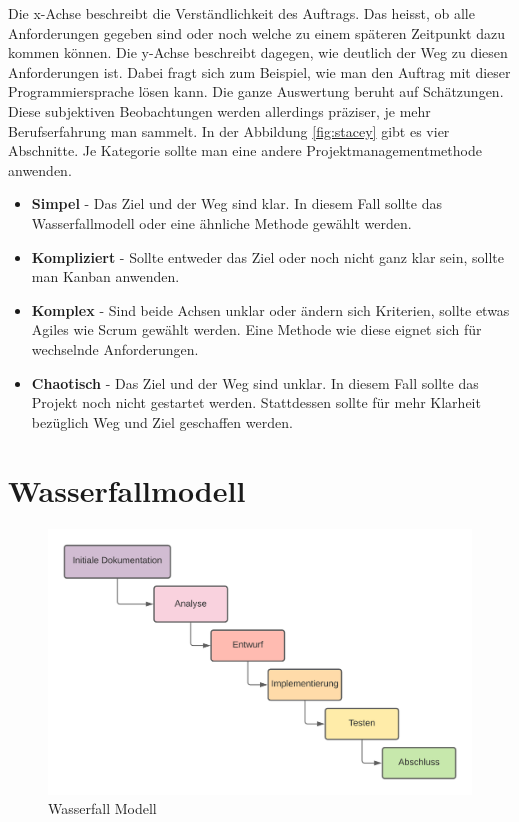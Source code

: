 Die x-Achse beschreibt die Verständlichkeit des Auftrags. Das heisst, ob alle Anforderungen gegeben sind oder noch welche zu einem späteren Zeitpunkt dazu kommen können. Die y-Achse beschreibt dagegen, wie deutlich der Weg zu diesen Anforderungen ist. Dabei fragt sich zum Beispiel, wie man den Auftrag mit dieser Programmiersprache lösen kann.
\newline
Die ganze Auswertung beruht auf Schätzungen. Diese subjektiven Beobachtungen werden allerdings präziser, je mehr Berufserfahrung man sammelt.
\newline
In der Abbildung \ref*{fig:stacey} gibt es vier Abschnitte. Je Kategorie sollte man eine andere Projektmanagementmethode anwenden.
\newpage
\begin{itemize}
  \item \textbf{Simpel} - Das Ziel und der Weg sind klar. In diesem Fall sollte das Wasserfallmodell oder eine ähnliche Methode gewählt werden.
  \item \textbf{Kompliziert} - Sollte entweder das Ziel oder noch nicht ganz klar sein, sollte man Kanban anwenden.
  \item \textbf{Komplex} - Sind beide Achsen unklar oder ändern sich Kriterien, sollte etwas Agiles wie Scrum gewählt werden. Eine Methode wie diese  eignet sich für wechselnde Anforderungen.
  \item \textbf{Chaotisch} - Das Ziel und der Weg sind unklar. In diesem Fall sollte das Projekt noch nicht gestartet werden. Stattdessen sollte für mehr Klarheit bezüglich Weg und Ziel geschaffen werden. 
\end{itemize}

\section{Wasserfallmodell}

\begin{figure}[!ht]
  \centering
  \includegraphics[width=.95\linewidth]{./images/OSEDashboard_Wasserfall.png}
  \caption[Ein von mir mit Lucidchart erstelltes Wasserfallmodell]{Wasserfall Modell}
  \label{fig:wasserfall}
\end{figure}

